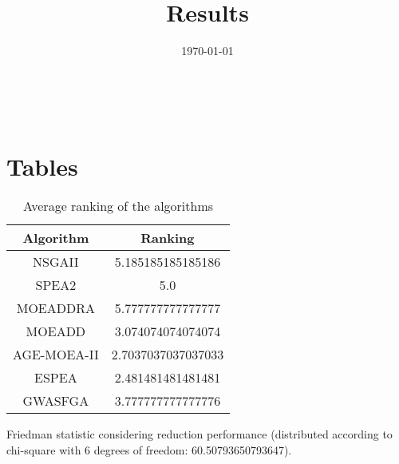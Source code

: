 \documentclass{article}
\title{Results}
\author{}
\date{\today}
\begin{document}
\oddsidemargin 0in \topmargin 0in\maketitle
\
\section{Tables}
\begin{table}[!htp]
\centering
\caption{Average ranking of the algorithms}
\begin{tabular}{c|c}
Algorithm&Ranking\\
\hline
NSGAII&5.185185185185186\\
SPEA2&5.0\\
MOEADDRA&5.777777777777777\\
MOEADD&3.074074074074074\\
AGE-MOEA-II&2.7037037037037033\\
ESPEA&2.481481481481481\\
GWASFGA&3.777777777777776\\
\end{tabular}
\end{table}


Friedman statistic considering reduction performance (distributed according to chi-square with 6 degrees of freedom: 60.50793650793647).
\end{document}
